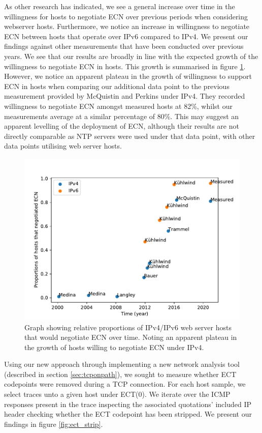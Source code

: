 \documentclass{l4proj}
\begin{document}
As other research has indicated, we see a general increase over time in the willingness for hosts to negotiate ECN over previous periods when considering webserver hosts. Furthermore, we notice an increase in willingness to negotiate ECN between hosts that operate over IPv6 compared to IPv4.  We present our findings against other measurements that have been conducted over previous years. We see that our results are broadly in line with the expected growth of the willingness to negotiate ECN in hosts. This growth is summarised in figure \ref{fig:ecngrowth}. However, we notice an apparent plateau in the growth of willingness to support ECN in hosts when comparing our additional data point to the previous measurement provided by McQuistin and Perkins \cite{mcquistin_is_2015} under IPv4. They recorded willingness to negotiate ECN amongst measured hosts at 82\%, whilst our measurements average at a similar percentage of 80\%. This may suggest an apparent levelling of the deployment of ECN, although their results are not directly comparable as NTP servers were used under that data point, with other data points utilising web server hosts.

\begin{figure}[H]
    \centering
    \includegraphics[scale=0.7]{dissertation/images/ecn_trends.pdf}
    \caption{Graph showing relative proportions of IPv4/IPv6 web server hosts that would negotiate ECN over time. Noting an apparent plateau in the growth of hosts willing to negotiate ECN under IPv4.}
    \label{fig:ecngrowth}
\end{figure}

Using our new approach through implementing a new network analysis tool (described in section \ref{sec:tcponpath}), we sought to measure whether ECT codepoints were removed during a TCP connection. For each host sample, we select traces unto a given host under ECT(0). We iterate over the ICMP responses present in the trace inspecting the associated quotations' included IP header checking whether the ECT codepoint has been stripped. We present our findings in figure \ref{fig:ect_strip}.
\end{document}

